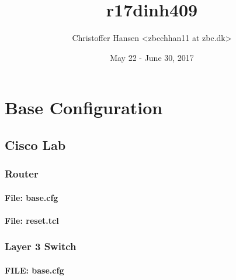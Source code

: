 \documentclass[a4paper,12pt,twoside,twocolumn]{book}
\begin{document}
\title{r17dinh409}
\author{Christoffer Hansen <zbcchhan11 at zbc.dk>}
\date{May 22 - June 30, 2017}
\maketitle

\tableofcontents

\setlength{\parskip}{0.35em}

\renewcommand{\baselinestretch}{1.15}


\chapter{Base Configuration}

\section{Cisco Lab}


\subsection{Router}
\subsubsection{File: base.cfg}
%
\subsubsection{File: reset.tcl}
%

\newpage


\subsection{Layer 3 Switch}
\subsubsection{FILE: base.cfg}

\end{document}
